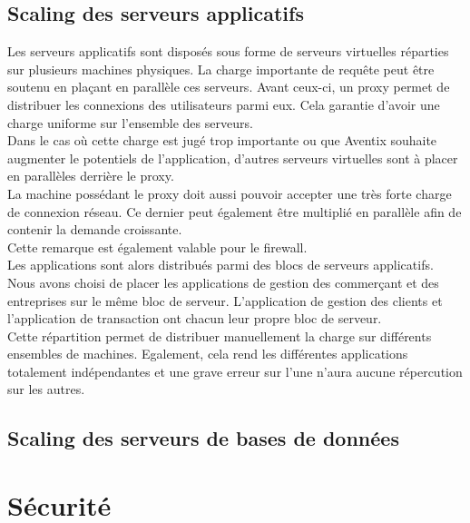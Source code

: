 \subsection{Scaling des serveurs applicatifs}
\label{subsec:scaling-applicatif}

Les serveurs applicatifs sont disposés sous forme de serveurs virtuelles
réparties sur plusieurs machines physiques. La charge importante de requête
peut être soutenu en plaçant en parallèle ces serveurs. Avant ceux-ci, un proxy
permet de distribuer les connexions des utilisateurs parmi eux. Cela garantie
d'avoir une charge uniforme sur l'ensemble des serveurs. \\

Dans le cas où cette charge est jugé trop importante ou que Aventix souhaite
augmenter le potentiels de l'application, d'autres serveurs virtuelles sont à
placer en parallèles derrière le proxy. \\

La machine possédant le proxy doit aussi pouvoir accepter une très forte charge
de connexion réseau. Ce dernier peut également être multiplié en parallèle afin
de contenir la demande croissante. \\

Cette remarque est également valable pour le firewall. \\

Les applications sont alors distribués parmi des blocs de serveurs applicatifs.
Nous avons choisi de placer les applications de gestion des commerçant et des
entreprises sur le même bloc de serveur. L'application de gestion des clients
et l'application de transaction ont chacun leur propre bloc de serveur. \\

Cette répartition permet de distribuer manuellement la charge sur différents
ensembles de machines. Egalement, cela rend les différentes applications
totalement indépendantes et une grave erreur sur l'une n'aura aucune
répercution sur les autres. \\

\subsection{Scaling des serveurs de bases de données}
\label{subsec:scaling-bdd}

\section{Sécurité}
\label{sec:securite}

